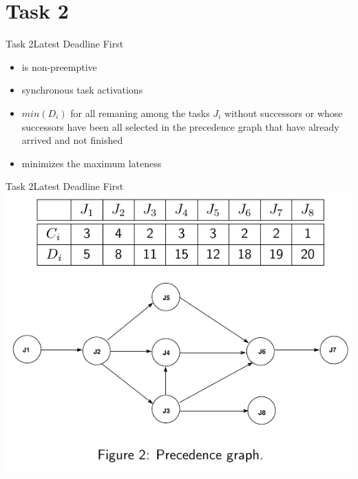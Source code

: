 
\section{Task 2}

\setcounter{task}{1}

\begin{frame}{Task 2}{Latest Deadline First}
  \begin{itemize}
    \item is \alert{non-preemptive}
    \item \alert{synchronous task activations}
    \item $min(D_i)$ for all remaning among the tasks $J_i$ without successors or whose successors have been all selected in the \alert{precedence graph} that have already \alert{arrived} and \alert{not finished}
    \item \alert{minimizes} the \alert{maximum lateness}
  \end{itemize}
\end{frame}

\begin{frame}{Task 2}{Latest Deadline First}
  \centering
  \includegraphics[height=0.7\paperheight]{./figures/2_tab_graph.png}
\end{frame}

